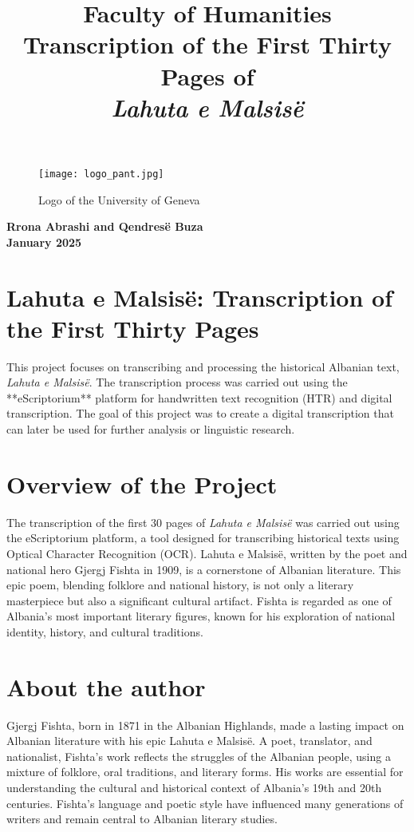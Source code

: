 \documentclass[12pt]{article}
\title{
  \vspace{-2cm} 
  \fontsize{30}{36}\selectfont \textbf{Faculty of Humanities} \\ 
  \fontsize{24}{28}\selectfont Transcription of the First Thirty Pages of \\ 
  \textit{Lahuta e Malsisë} 
}
\date{}
\begin{document}
\maketitle
\begin{figure}[ht]
    \centering
    \texttt{[image: logo\_pant.jpg]}
    \caption{Logo of the University of Geneva}
    \label{fig:logo}
    \vspace{2cm}
\end{figure}

\vspace{\fill}
\begin{center}
    \textbf{Rrona Abrashi and Qendresë Buza} \\[0.5cm]
    \textbf{January 2025} \\[1cm]
\end{center}


\newpage

\section*{Lahuta e Malsisë: Transcription of the First Thirty Pages}
This project focuses on transcribing and processing the historical Albanian text, \textit{Lahuta e Malsisë}. The transcription process was carried out using the **eScriptorium** platform for handwritten text recognition (HTR) and digital transcription. The goal of this project was to create a digital transcription that can later be used for further analysis or linguistic research.


\section*{Overview of the Project}
The transcription of the first 30 pages of \textit{Lahuta e Malsisë} was carried out using the eScriptorium platform, a tool designed for transcribing historical texts using Optical Character Recognition (OCR). Lahuta e Malsisë, written by the poet and national hero Gjergj Fishta in 1909, is a cornerstone of Albanian literature. This epic poem, blending folklore and national history, is not only a literary masterpiece but also a significant cultural artifact. Fishta is regarded as one of Albania's most important literary figures, known for his exploration of national identity, history, and cultural traditions.

\section*{About the author}
Gjergj Fishta, born in 1871 in the Albanian Highlands, made a lasting impact on Albanian literature with his epic Lahuta e Malsisë. A poet, translator, and nationalist, Fishta's work reflects the struggles of the Albanian people, using a mixture of folklore, oral traditions, and literary forms. His works are essential for understanding the cultural and historical context of Albania’s 19th and 20th centuries. Fishta's language and poetic style have influenced many generations of writers and remain central to Albanian literary studies.
\end{document}

